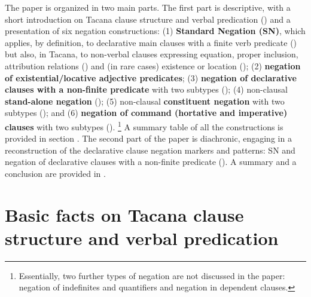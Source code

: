 \documentclass[output=paper]{langsci/langscibook}
\begin{document}
The paper is organized in two main parts. The first part is descriptive,
with a short introduction on Tacana clause structure and verbal predication
() and a presentation of six negation constructions:
(1) \textbf{Standard Negation (SN)}, which applies, by definition, to
declarative main clauses with a finite verb predicate
\parencite{Miestamo2005}
() but also, in Tacana, to non-verbal clauses
expressing equation, proper inclusion,
attribution relations () and (in rare cases)
existence or location (); 
(2) \textbf{negation of existential\slash loca\-ti\-ve adjective
predicates};
(3) \textbf{negation of declarative clauses with a non-finite
predicate} with two subtypes ();
(4) non-clausal \textbf{stand-alone negation}
(); 
(5) non-clausal \textbf{constituent negation} with two subtypes (); and
(6) \textbf{negation of command (hortative and imperative) clauses} with
two subtypes ().%
%
\footnote{Essentially, two further
types of negation are not discussed in the paper: negation of indefinites
and quantifiers and negation in dependent clauses.} %
%
A summary table of all the constructions is provided in section
. The second part
of the paper is diachronic, engaging in a reconstruction of the
declarative clause negation markers and patterns: SN and negation of
declarative clauses with a non-finite predicate ().
A summary and a conclusion are provided in .

\section{Basic facts on Tacana clause structure and verbal predication}%
\label{sec:tacana-2}
\end{document}

